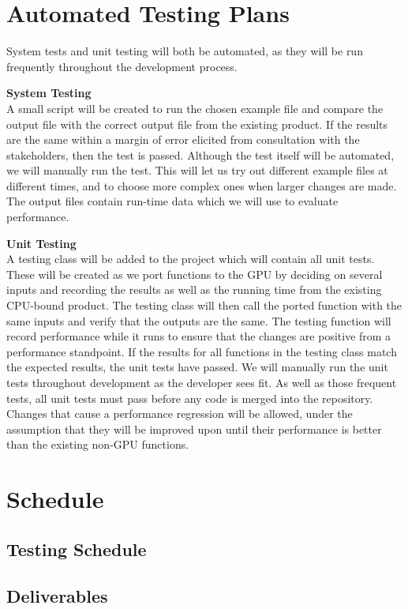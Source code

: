 \documentclass[12pt]{article}
\begin{document}
\section{Automated Testing Plans} %
System tests and unit testing will both be automated, as they will be run frequently throughout the development process. 

\textbf{System Testing}\\
A small script will be created to run the chosen example file and compare the output file with the correct output file from the existing product. If the results are the same within a margin of error elicited from consultation with the stakeholders, then the test is passed. Although the test itself will be automated, we will manually run the test. This will let us try out different example files at different times, and to choose more complex ones when larger changes are made. The output files contain run-time data which we will use to evaluate performance.

\textbf{Unit Testing}\\
A testing class will be added to the project which will contain all unit tests. These will be created as we port functions to the GPU by deciding on several inputs and recording the results as well as the running time from the existing CPU-bound product. The testing class will then call the ported function with the same inputs and verify that the outputs are the same. The testing function will record performance while it runs to ensure that the changes are positive from a performance standpoint. If the results for all functions in the testing class match the expected results, the unit tests have passed. We will manually run the unit tests throughout development as the developer sees fit. As well as those frequent tests, all unit tests must pass before any code is merged into the repository. Changes that cause a performance regression will be allowed, under the assumption that they will be improved upon until their performance is better than the existing non-GPU functions.

\section{Schedule}

\subsection{Testing Schedule} %

\subsection{Deliverables} %
\end{document}
